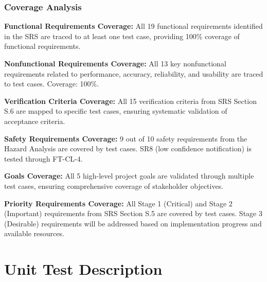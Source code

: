 \documentclass[12pt, titlepage]{article}
\begin{document}
\subsubsection{Coverage Analysis}

\textbf{Functional Requirements Coverage:} All 19 functional requirements
identified in the SRS are traced to at least one test case, providing 100\%
coverage of functional requirements.

\textbf{Nonfunctional Requirements Coverage:} All 13 key nonfunctional
requirements related to performance, accuracy, reliability, and usability are
traced to test cases. Coverage: 100\%.

\textbf{Verification Criteria Coverage:} All 15 verification criteria from SRS
Section S.6 are mapped to specific test cases, ensuring systematic validation
of acceptance criteria.

\textbf{Safety Requirements Coverage:} 9 out of 10 safety requirements from the
Hazard Analysis are covered by test cases. SR8 (low confidence notification) is
tested through FT-CL-4.

\textbf{Goals Coverage:} All 5 high-level project goals are validated through
multiple test cases, ensuring comprehensive coverage of stakeholder objectives.

\textbf{Priority Requirements Coverage:} All Stage 1 (Critical) and Stage 2
(Important) requirements from SRS Section S.5 are covered by test cases. Stage
3 (Desirable) requirements will be addressed based on implementation progress
and available resources.

\section{Unit Test Description}



\end{document}
